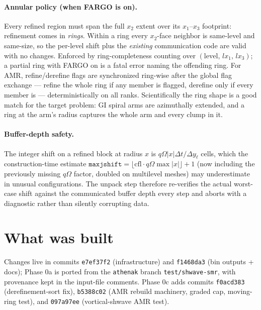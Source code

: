 \documentclass[11pt]{article}
\newcommand{\code}[1]{\texttt{#1}}
\begin{document}
\paragraph{Annular policy (when FARGO is on).} Every refined region must span the full
$x_2$ extent over its $x_1$--$x_3$ footprint: refinement comes in \emph{rings}. Within
a ring every $x_2$-face neighbor is same-level and same-size, so the per-level shift
plus the \emph{existing} communication code are valid with no changes. Enforced by
ring-completeness counting over $(\mathrm{level},\,lx_1,\,lx_3)$; a partial ring with
FARGO on is a fatal error naming the offending ring. For AMR, refine/derefine flags
are synchronized ring-wise after the global flag exchange --- refine the whole ring if
any member is flagged, derefine only if every member is --- deterministically on all
ranks. Scientifically the ring shape is a good match for the target problem: GI spiral
arms are azimuthally extended, and a ring at the arm's radius captures the whole arm
and every clump in it.

\paragraph{Buffer-depth safety.} The integer shift on a refined block at radius $x$ is
$q\Omega|x|\Delta t/\Delta y_\ell$ cells, which the construction-time estimate
$\code{maxjshift} = \lfloor \mathrm{cfl}\cdot q\Omega\max|x| \rfloor + 1$ (now
including the previously missing $q\Omega$ factor, doubled on multilevel meshes) may
underestimate in unusual configurations. The unpack step therefore re-verifies the
actual worst-case shift against the communicated buffer depth every step and aborts
with a diagnostic rather than silently corrupting data.

\section{What was built}
\label{sec:impl}

Changes live in commits \code{e7ef37f2} (infrastructure) and \code{f1468da3}
(bin outputs + docs); Phase 0a is ported from the \code{athenak} branch
\code{test/shwave-smr}, with provenance kept in the input-file comments.
Phase 0c adds commits \code{f0acd383} (derefinement-sort fix), \code{b5388c02}
(AMR rebuild machinery, graded cap, moving-ring test), and \code{097a97ee}
(vortical-shwave AMR test).
\end{document}
